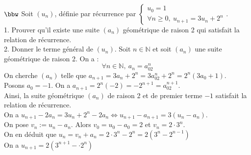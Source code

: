 \documentclass[11pt]{article}
\begin{document}
\begin{exercice}{$\bbw$}{}
    Soit $(u_n)$, définie par récurrence par $\begin{cases}u_0=1\\\forall n \geq 0, ~ u_{n+1} = 3u_n + 2^n\end{cases}$.\\
    1. Prouver qu'il existe une suite $(a_n)$ géométrique de raison 2 qui satisfait la relation de récurrence.\\
    2. Donner le terme général de $(u_n)$.
    \tcblower
     Soit $n\in\mathbb{N}$ et soit $(a_n)$ une suite géométrique de raison 2. On a :
    \begin{equation*}
        \forall n\in\mathbb{N}, ~ a_n = a_02^{n}
    \end{equation*}
    On cherche $(a_n)$ telle que $a_{n+1} = 3a_n + 2^n = 3a_02^n+2^n = 2^n(3a_0+1)$.\\
    Posons $a_0 = -1$. On a $a_{n+1} = 2^n(-2) = -2^{n+1} = a_02^{n+1}$.\\
    Ainsi, la suite géométrique $(a_n)$ de raison 2 et de premier terme $-1$ satisfait la relation de récurrence.\\
     On a $u_{n+1} - 2a_n = 3u_n + 2^n - 2a_n \iff u_{n+1} - a_{n+1} = 3(u_n - a_n)$.\\
    On pose $v_n := u_n - a_n$. Alors $v_0 = u_0 - a_0 = 2$ et $v_n = 2\cdot3^n$.\\
    On en déduit que $u_n = v_n + a_n = 2\cdot3^n - 2^n = 2(3^n - 2^{n-1})$\\
    On a $u_{n+1} = 2(3^{n+1} - \cdot2^{n})$
\end{exercice}
\end{document}
